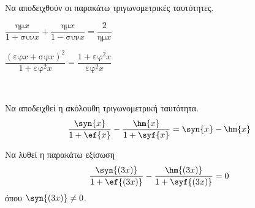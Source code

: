 \documentclass[twoside,nofonts,internet,math,spyros]{frontisthrio-diag}
\begin{document}
\begin{thema}
\item\mbox{}\\
Να αποδειχθούν οι παρακάτω τριγωνομετρικές ταυτότητες.
\begin{multicols}{2}
\begin{erwthma}
\item $ \dfrac{\textrm{ημ}{x}}{1+\textrm{συν}{x}}+\dfrac{\textrm{ημ}{x}}{1-\textrm{συν}{x}}=\dfrac{2}{\textrm{ημ}{x}} $
\item $ \dfrac{\left( \textrm{εφ}{x}+\textrm{σφ}{x}\right)^2 }{1+\textrm{εφ}^2{x}}=\dfrac{1+\textrm{εφ}^2{x}}{\textrm{εφ}^2{x}} $
\end{erwthma}
\end{multicols}
\item\mbox{}\\
\vspace{-7mm}
\begin{erwthma}
\item Να αποδειχθεί η ακόλουθη τριγωνομετρική ταυτότητα.
\[ \frac{\syn{x}}{1+\ef{x}}-\frac{\hm{x}}{1+\syf{x}}=\syn{x}-\hm{x} \]
\item Να λυθεί η παρακάτω εξίσωση
\[ \frac{\syn{(3x)}}{1+\ef{(3x)}}-\frac{\hm{(3x)}}{1+\syf{(3x)}}=0 \]
όπου $ \syn{(3x)}\neq0 $.
\end{erwthma}
\end{thema}
\kaliepityxia
\end{document}
